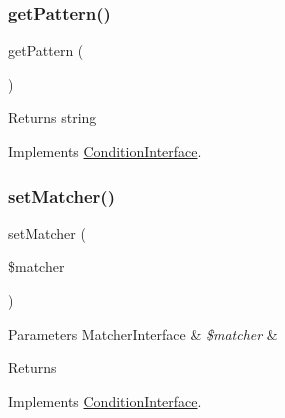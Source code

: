 \mbox{\label{class_pes_1_1_query_1_1_condition_a86d92279529520a45589a56c2247355e}} 
\subsubsection{\texorpdfstring{get\+Pattern()}{getPattern()}}
{\footnotesize\ttfamily get\+Pattern (\begin{DoxyParamCaption}{ }\end{DoxyParamCaption})}

\begin{DoxyReturn}{Returns}
string 
\end{DoxyReturn}


Implements \mbox{\hyperlink{interface_pes_1_1_query_1_1_condition_interface_a86d92279529520a45589a56c2247355e}{Condition\+Interface}}.

\mbox{\label{class_pes_1_1_query_1_1_condition_a0d9ceb80245da7ba5be1dbcee4d98a4e}} 
\subsubsection{\texorpdfstring{set\+Matcher()}{setMatcher()}}
{\footnotesize\ttfamily set\+Matcher (\begin{DoxyParamCaption}\item[{\mbox{\hyperlink{interface_pes_1_1_query_1_1_matcher_1_1_matcher_interface}{Matcher\+Interface}}}]{\$matcher }\end{DoxyParamCaption})}


\begin{DoxyParams}[1]{Parameters}
Matcher\+Interface & {\em \$matcher} & \\
\hline
\end{DoxyParams}
\begin{DoxyReturn}{Returns}

\end{DoxyReturn}


Implements \mbox{\hyperlink{interface_pes_1_1_query_1_1_condition_interface_a0d9ceb80245da7ba5be1dbcee4d98a4e}{Condition\+Interface}}.

